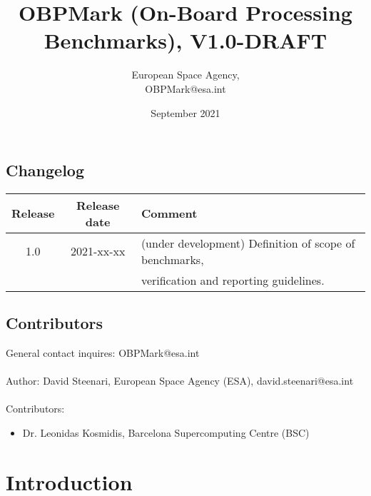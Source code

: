 \documentclass{report}
\title{OBPMark (On-Board Processing Benchmarks), V1.0-DRAFT}
\author{European Space Agency,\\ OBPMark@esa.int}
\date{September 2021}
\begin{document}
\maketitle
\newpage

\section*{Changelog} 

\begin{tabular}{|c|c|l|}
    \hline
    Release &  Release date & Comment \\ \hline
    \hline
    1.0 & 2021-xx-xx    & (under development) Definition of scope of benchmarks,\\
        &               & verification and reporting guidelines. \\ 
    \hline
\end{tabular}
\label{tab:changelog}

\section*{Contributors}
General contact inquires: OBPMark@esa.int
\\
\\
Author: David Steenari, European Space Agency (ESA), david.steenari@esa.int
\\
\\
Contributors: 
\begin{itemize}
    \item Dr. Leonidas Kosmidis, Barcelona Supercomputing Centre (BSC)
\end{itemize}


\tableofcontents
\newpage 


\chapter{Introduction}
\end{document}
